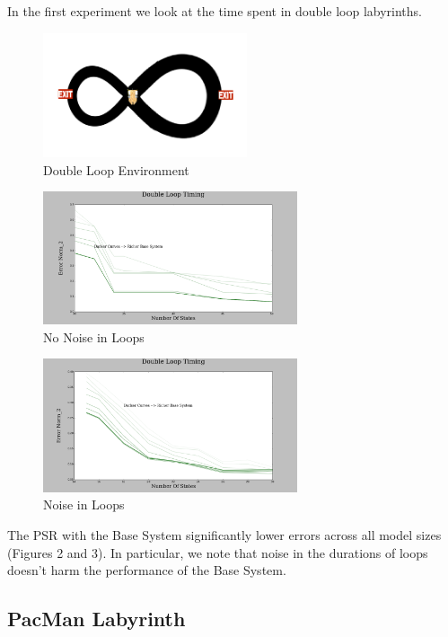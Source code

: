 \documentclass{acm_proc_article-sp}
\begin{document}
{In the first experiment we look at the time spent in double loop labyrinths. 


\begin{figure}[ht!]
\centering
\includegraphics[width=60mm]{lucasplots/monImages/doubleLoopImage.png}
\caption{Double Loop Environment\label{overflow}}
\end{figure}

\begin{figure}[ht!]
\centering
\includegraphics[width=75mm]{lucasplots/monImages/DoubleLoopTiming0.png}
\caption{No Noise in Loops \label{overflow}}
\end{figure}

\begin{figure}[ht!]
\centering
\includegraphics[width=75mm]{lucasplots/monImages/DoubleLoopTiming0_1.png}
\caption{Noise in Loops \label{overflow}}
\end{figure}

The PSR with the Base System significantly lower errors across all model sizes (Figures 2 and 3). In particular, we note that noise in the durations of loops doesn't harm the performance of the Base System.

\subsection{PacMan Labyrinth}

}
\end{document}
